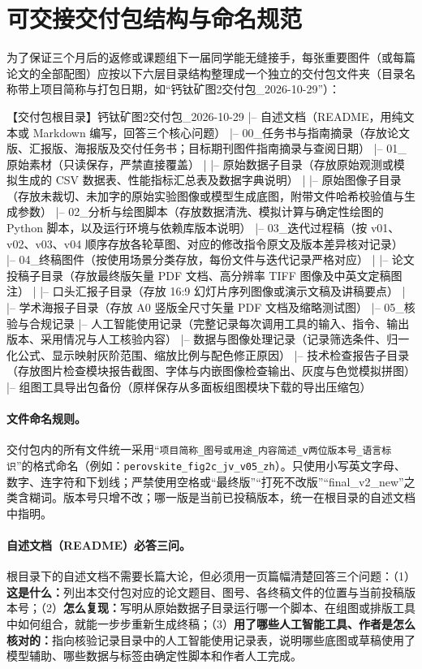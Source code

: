 \section{可交接交付包结构与命名规范}

为了保证三个月后的返修或课题组下一届同学能无缝接手，每张重要图件（或每篇论文的全部配图）应按以下六层目录结构整理成一个独立的交付包文件夹（目录名称带上项目简称与打包日期，如“钙钛矿图2交付包\_2026-10-29”）：

\begin{Prompt}
【交付包根目录】钙钛矿图2交付包_2026-10-29
  |-- 自述文档（README，用纯文本或 Markdown 编写，回答三个核心问题）
  |-- 00_任务书与指南摘录（存放论文版、汇报版、海报版及交付任务书；目标期刊图件指南摘录与查阅日期）
  |-- 01_原始素材（只读保存，严禁直接覆盖）
  |     |-- 原始数据子目录（存放原始观测或模拟生成的 CSV 数据表、性能指标汇总表及数据字典说明）
  |     |-- 原始图像子目录（存放未裁切、未加字的原始实验图像或模型生成底图，附带文件哈希校验值与生成参数）
  |-- 02_分析与绘图脚本（存放数据清洗、模拟计算与确定性绘图的 Python 脚本，以及运行环境与依赖库版本说明）
  |-- 03_迭代过程稿（按 v01、v02、v03、v04 顺序存放各轮草图、对应的修改指令原文及版本差异核对记录）
  |-- 04_终稿图件（按使用场景分类存放，每份文件与迭代记录严格对应）
  |     |-- 论文投稿子目录（存放最终版矢量 PDF 文档、高分辨率 TIFF 图像及中英文定稿图注）
  |     |-- 口头汇报子目录（存放 16:9 幻灯片序列图像或演示文稿及讲稿要点）
  |     |-- 学术海报子目录（存放 A0 竖版全尺寸矢量 PDF 文档及缩略测试图）
  |-- 05_核验与合规记录
        |-- 人工智能使用记录（完整记录每次调用工具的输入、指令、输出版本、采用情况与人工核验内容）
        |-- 数据与图像处理记录（记录筛选条件、归一化公式、显示映射灰阶范围、缩放比例与配色修正原因）
        |-- 技术检查报告子目录（存放图片检查模块报告截图、字体与内嵌图像检查输出、灰度与色觉模拟拼图）
        |-- 组图工具导出包备份（原样保存从多面板组图模块下载的导出压缩包）
\end{Prompt}

\paragraph{文件命名规则。}
交付包内的所有文件统一采用“\texttt{项目简称\_图号或用途\_内容简述\_v两位版本号\_语言标识}”的格式命名（例如：\texttt{perovskite\_fig2c\_jv\_v05\_zh}）。只使用小写英文字母、数字、连字符和下划线；严禁使用空格或“最终版”“打死不改版”“final\_v2\_new”之类含糊词。版本号只增不改；哪一版是当前已投稿版本，统一在根目录的自述文档中指明。

\paragraph{自述文档（README）必答三问。}
根目录下的自述文档不需要长篇大论，但必须用一页篇幅清楚回答三个问题：（1）\textbf{这是什么：}列出本交付包对应的论文题目、图号、各终稿文件的位置与当前投稿版本号；（2）\textbf{怎么复现：}写明从原始数据子目录运行哪一个脚本、在组图或排版工具中如何组合，就能一步步重新生成终稿；（3）\textbf{用了哪些人工智能工具、作者是怎么核对的：}指向核验记录目录中的人工智能使用记录表，说明哪些底图或草稿使用了模型辅助、哪些数据与标签由确定性脚本和作者人工完成。


